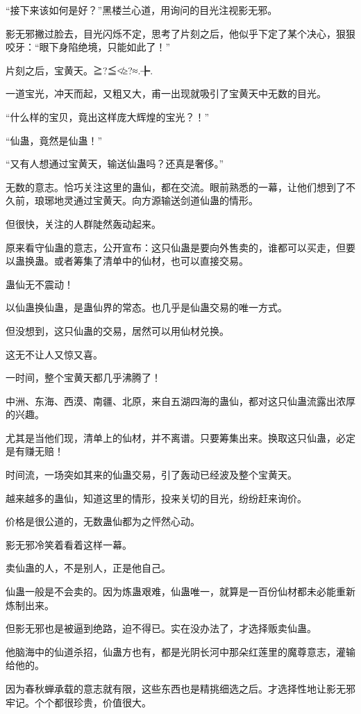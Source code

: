 \begin{this_body}
“接下来该如何是好？”黑楼兰心道，用询问的目光注视影无邪。

影无邪撇过脸去，目光闪烁不定，思考了片刻之后，他似乎下定了某个决心，狠狠咬牙：“眼下身陷绝境，只能如此了！”

片刻之后，宝黄天。≧?≦≮≥?≈.╊.

一道宝光，冲天而起，又粗又大，甫一出现就吸引了宝黄天中无数的目光。

“什么样的宝贝，竟出这样庞大辉煌的宝光？！”

“仙蛊，竟然是仙蛊！”

“又有人想通过宝黄天，输送仙蛊吗？还真是奢侈。”

无数的意志。恰巧关注这里的蛊仙，都在交流。眼前熟悉的一幕，让他们想到了不久前，琅琊地灵通过宝黄天。向方源输送剑道仙蛊的情形。

但很快，关注的人群陡然轰动起来。

原来看守仙蛊的意志，公开宣布：这只仙蛊是要向外售卖的，谁都可以买走，但要以蛊换蛊。或者筹集了清单中的仙材，也可以直接交易。

蛊仙无不震动！

以仙蛊换仙蛊，是蛊仙界的常态。也几乎是仙蛊交易的唯一方式。

但没想到，这只仙蛊的交易，居然可以用仙材兑换。

这无不让人又惊又喜。

一时间，整个宝黄天都几乎沸腾了！

中洲、东海、西漠、南疆、北原，来自五湖四海的蛊仙，都对这只仙蛊流露出浓厚的兴趣。

尤其是当他们现，清单上的仙材，并不离谱。只要筹集出来。换取这只仙蛊，必定是有赚无赔！

时间流，一场突如其来的仙蛊交易，引了轰动已经波及整个宝黄天。

越来越多的蛊仙，知道这里的情形，投来关切的目光，纷纷赶来询价。

价格是很公道的，无数蛊仙都为之怦然心动。

影无邪冷笑着看着这样一幕。

卖仙蛊的人，不是别人，正是他自己。

仙蛊一般是不会卖的。因为炼蛊艰难，仙蛊唯一，就算是一百份仙材都未必能重新炼制出来。

但影无邪也是被逼到绝路，迫不得已。实在没办法了，才选择贩卖仙蛊。

他脑海中的仙道杀招，仙蛊方也有，都是光阴长河中那朵红莲里的魔尊意志，灌输给他的。

因为春秋蝉承载的意志就有限，这些东西也是精挑细选之后。才选择性地让影无邪牢记。个个都很珍贵，价值很大。


\end{this_body}
